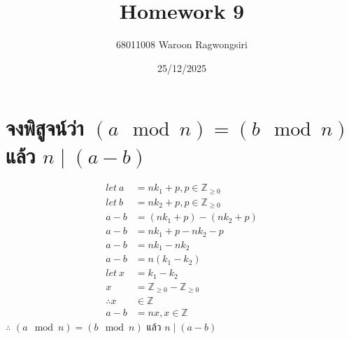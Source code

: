 \documentclass{article}
\title{Homework 9}
\author{68011008 Waroon Ragwongsiri}
\date{25/12/2025}
\begin{document}
\maketitle

{\small
\section{จงพิสูจน์ว่า $(a \mod n) = (b \mod n)$ แล้ว $n \mid (a-b)$}
}
\begin{align}
	let \ a &= nk_1 + p, p \in \mathbb{Z}_{\ge 0} \\
	let \ b &= nk_2 + p, p \in \mathbb{Z}_{\ge 0} \\
	a - b &= (nk_1 + p) - (nk_2 + p) \\ 
	a - b &= nk_1 + p - nk_2 - p \\
	a - b &= nk_1 - nk_2 \\
	a - b &= n(k_1 - k_2) \\
	let \ x &= k_1 - k_2 \\
	x &= \mathbb{Z}_{\ge 0} - \mathbb{Z}_{\ge 0} \\
	\therefore x &\in \mathbb{Z} \\
	a - b &= nx, x \in \mathbb{Z}
\end{align}
\subitem
$\therefore$ $(a \mod n) = (b \mod n)$ แล้ว $n \mid (a-b)$
\end{document}
